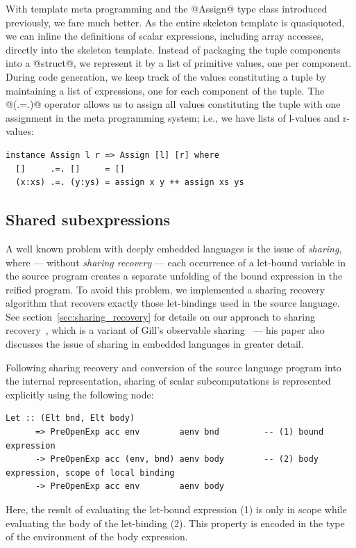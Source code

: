 With template meta programming and the @Assign@ type class introduced
previously, we fare much better. As the entire skeleton template is quasiquoted,
we can inline the definitions of scalar expressions, including array accesses,
directly into the skeleton template. Instead of packaging the tuple components
into a @struct@, we represent it by a list of primitive values, one per
component. During code generation, we keep track of the values constituting a
tuple by maintaining a list of expressions, one for each component of the tuple.
The @(.=.)@ operator allows us to assign all values constituting the tuple
with one assignment in the meta programming system; i.e., we have lists of
l-values and r-values:
%
\begin{lstlisting}[style=haskell]
instance Assign l r => Assign [l] [r] where
  []     .=. []     = []
  (x:xs) .=. (y:ys) = assign x y ++ assign xs ys
\end{lstlisting}


\subsection{Shared subexpressions}
\label{sec:shared_subexpressions}

A well known problem with deeply embedded languages is the issue of
\emph{sharing}, where --- without \emph{sharing recovery} --- each occurrence of
a let-bound variable in the source program creates a separate unfolding of the
bound expression in the reified program. To avoid this problem, we implemented a
sharing recovery algorithm that recovers exactly those let-bindings used in the
source language. See section~\ref{sec:sharing_recovery} for details on our
approach to sharing recovery~\cite{McDonell:2013wi}, which is a variant of
Gill's observable sharing~\cite{Gill:2009dx} --- his paper also discusses the
issue of sharing in embedded languages in greater detail.

Following sharing recovery and conversion of the source language program into
the internal  representation, sharing of scalar
subcomputations is represented explicitly using the following \AST node:
%
\begin{lstlisting}[style=haskell]
  Let :: (Elt bnd, Elt body)
      => PreOpenExp acc env        aenv bnd         -- (1) bound expression
      -> PreOpenExp acc (env, bnd) aenv body        -- (2) body expression, scope of local binding
      -> PreOpenExp acc env        aenv body
\end{lstlisting}
%
Here, the result of evaluating the let-bound expression (1) is only in scope
while evaluating the body of the let-binding (2). This property is encoded in
the type of the environment of the body expression.

